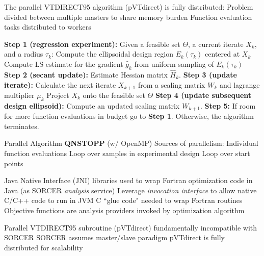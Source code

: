 
\bigskip \bigskip
The parallel VTDIRECT95 algorithm (pVTdirect) is fully distributed:
\bull Problem divided between multiple masters to share memory burden
\bull Function evaluation tasks distributed to workers
\bigskip
{}
\vfil\eject


\bigskip\bigskip
{\bf Step 1 (regression experiment):}
Given a feasible set $\Theta$, a current iterate $X_k$, and a radius $\tau_k$:
\bull Compute the ellipsoidal design region $E_k(\tau_k)$ centered at $X_k$
\bull Compute LS estimate for the gradient $\hat g_k$ from uniform sampling of
$E_k(\tau_k)$
\medskip
{\bf Step 2 (secant update):} Estimate 
Hessian matrix $\hat H_k$.
\medskip
{\bf Step 3 (update iterate):} Calculate the next iterate $X_{k+1}$ from
a scaling matrix $W_k$ and lagrange multiplier $\mu_k$
\bull Project $X_k$ onto the feasible set $\Theta$
\medskip
{\bf Step 4 (update subsequent design ellipsoid):} Compute an updated scaling
matrix $W_{k+1}$.
\medskip
{\bf Step 5:} If room for more function evaluations in budget go to {\bf Step 1}.
Otherwise, the algorithm terminates.
\vfil\eject

\bigskip \bigskip
Parallel Algorithm {\bf QNSTOPP} (w/ OpenMP)
\bigskip \bigskip
Sources of parallelism:\smallskip
\bull Individual function evaluations\smallskip
\bull Loop over samples in experimental design\smallskip
\bull Loop over start points
\vfil\eject

\bigskip \bigskip
Java Native Interface (JNI) libraries used to wrap Fortran optimization code
in Java (as SORCER {\it analysis} service)
\bull Leverage {\it invocation interface} to allow native C/C++ code to run
in JVM
\bull C ``glue code" needed to wrap Fortran routines
\bull Objective functions are analysis providers invoked by optimization
algorithm
\smallskip
{}
\vfil\eject

\bigskip \bigskip
Parallel VTDIRECT95 subroutine (pVTdirect) fundamentally incompatible with
SORCER
\bull SORCER assumes master/slave paradigm
\bull pVTdirect is fully distributed for scalability
\vfil\eject

